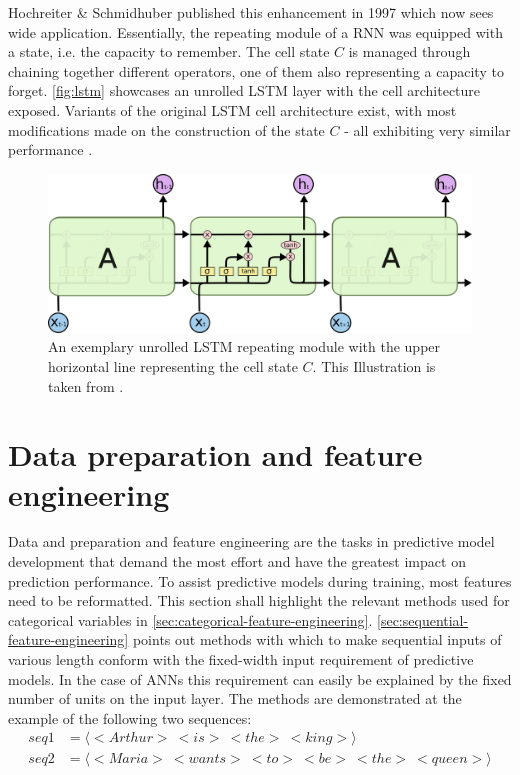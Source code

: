 Hochreiter \& Schmidhuber published this enhancement in 1997 \cite{hochreiter1997} which now sees wide application. Essentially, the repeating module of a RNN was equipped with a state, i.e. the capacity to remember. The cell state $C$ is managed through chaining together different operators, one of them also representing a capacity to forget. \autoref{fig:lstm} showcases an unrolled LSTM layer with the cell architecture exposed. Variants of the original LSTM cell architecture exist, with most modifications made on the construction of the state $C$ - all exhibiting very similar performance \cite{greff2017lstm}.

\begin{figure}[ht!]
    \centering
    \includegraphics[width=.8\textwidth]{gfx/lstm-chain.png}
    \caption{An exemplary unrolled LSTM repeating module with the upper horizontal line representing the cell state $C$. This Illustration is taken from \cite{web:colah}.}
    \label{fig:lstm}
\end{figure}

\section{Data preparation and feature engineering}
Data and preparation and feature engineering are the tasks in predictive model development that demand the most effort and have the greatest impact on prediction performance. To assist predictive models during training, most features need to be reformatted. This section shall highlight the relevant methods used for categorical variables in \autoref{sec:categorical-feature-engineering}. \autoref{sec:sequential-feature-engineering} points out methods with which to make sequential inputs of various length conform with the fixed-width input requirement of predictive models. In the case of ANNs this requirement can easily be explained by the fixed number of units on the input layer. The methods are demonstrated at the example of the following two sequences:
\begin{equation*}
    \begin{split}
        seq1 &= \langle<Arthur>\ <is>\ <the>\ <king>\rangle\\
        seq2 &= \langle<Maria>\ <wants>\ <to>\ <be>\ <the>\ <queen>\rangle
    \end{split}
\end{equation*}


